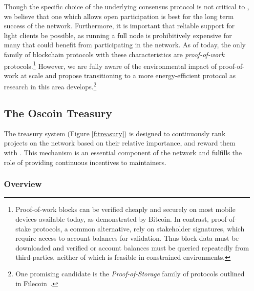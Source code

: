 Though the specific choice of the underlying consensus protocol is not
critical to \oscoin{}, we believe that one which allows open
participation is best for the long term success of the network. Furthermore,
it is important that reliable support for light clients be possible, as
running a full node is prohibitively expensive for many that could
benefit from participating in the \oscoin{} network. As of today, the only family of
blockchain protocols with these characteristics are \emph{proof-of-work}
protocols.\footnote{Proof-of-work blocks
can be verified cheaply and securely on most mobile devices available
today, as demonstrated by Bitcoin. In contrast, proof-of-stake protocols,
a common alternative, rely on stakeholder signatures, which require access to
account balances for validation. Thus block data must be downloaded and
verified or account balances must be queried repeatedly from third-parties,
neither of which is feasible in constrained environments.} However, we are
fully aware of the environmental impact of proof-of-work at
scale and propose transitioning to a more energy-efficient protocol as research in
this area develops.\footnote{One promising candidate is the \emph{Proof-of-Storage} family of
protocols outlined in Filecoin~\cite{filecoin}.}

\begin{figure*}[!ht]
    \par\medskip\noindent\minipage{\linewidth}
    \centering
    
    \caption{The \Oscoin{} Treasury System\label{f:treasury}}
    \endminipage\par\medskip
\end{figure*}

\subsection{The Oscoin Treasury}
\label{s:treasury}

The treasury system (Figure \ref{f:treasury}) is designed to continuously
rank projects on the network based on their relative importance, and reward them with
\oscoin{}. This mechanism is an essential component of the network and fulfills the
role of providing continuous incentives to maintainers.

\subsubsection{Overview}

